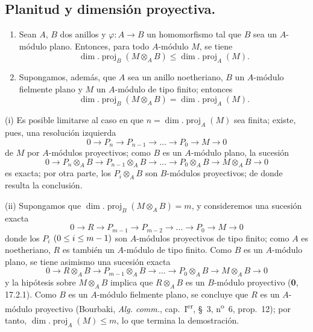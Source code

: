 \subsection{Planitud y dimensión proyectiva.}

\begin{proposition}[6.2.1]
\label{IV.2.s6.2.1-fr}
\begin{enumerate}
\item[\textup{(i)}] Sean $A$, $B$ dos anillos y $\varphi:A\to B$ un homomorfismo tal
que $B$ sea un $A$-módulo plano. Entonces, para todo $A$-módulo $M$, se tiene
\begin{equation}
\dim.\operatorname{proj}_B(M\otimes_AB)
\leq\dim.\operatorname{proj}_A(M).
\tag{6.2.1.1}\label{IV.2.s6.2.1.1-fr}
\end{equation}
\item[\textup{(ii)}] Supongamos, además, que $A$ sea un anillo noetheriano, $B$ un
$A$-módulo fielmente plano y $M$ un $A$-módulo de tipo finito; entonces
\begin{equation}
\dim.\operatorname{proj}_B(M\otimes_AB)
=\dim.\operatorname{proj}_A(M).
\tag{6.2.1.2}\label{IV.2.s6.2.1.2-fr}
\end{equation}
\end{enumerate}
\end{proposition}

(i) Es posible limitarse al caso en que
$n=\dim.\operatorname{proj}_A(M)$ sea finita; existe, pues, una resolución
izquierda
\[
0\to P_n\to P_{n-1}\to\ldots\to P_0\to M\to0
\]
de $M$ por $A$-módulos proyectivos; como $B$ es un $A$-módulo plano, la
sucesión
\[
0\to P_n\otimes_AB\to P_{n-1}\otimes_AB\to\ldots\to
P_0\otimes_AB\to M\otimes_AB\to0
\]
es exacta; por otra parte, los $P_i\otimes_AB$ son $B$-módulos proyectivos;
de donde resulta la conclusión.

(ii) Supongamos que $\dim.\operatorname{proj}_B(M\otimes_AB)=m$, y consideremos
una sucesión exacta
\[
0\to R\to P_{m-1}\to P_{m-2}\to\ldots\to P_0\to M\to0
\]
donde los $P_i$ $(0\leq i\leq m- 1)$ son $A$-módulos proyectivos de tipo finito;
como $A$ es noetheriano, $R$ es también un $A$-módulo de tipo finito. Como $B$
es un $A$-módulo plano, se tiene asimismo una sucesión exacta
\[
0\to R\otimes_AB\to P_{m-1}\otimes_AB\to\ldots\to
P_0\otimes_AB\to M\otimes_AB\to0
\]
y la hipótesis sobre $M\otimes_AB$ implica que $R\otimes_AB$ es un $B$-módulo
proyectivo (\textbf 0, 17.2.1). Como $B$ es un $A$-módulo fielmente plano, se concluye
que $R$ es un $A$-módulo proyectivo (Bourbaki, \emph{Alg. comm.},
cap.~I\textsuperscript{er}, §~3, n\textsuperscript{o}~6, prop.~12); por tanto,
$\dim.\operatorname{proj}_A(M)\leq m$, lo que termina la demostración.
